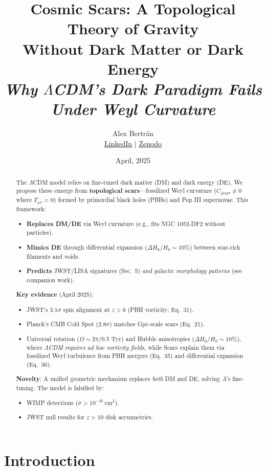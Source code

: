 \documentclass{article}
\title{
  \textbf{Cosmic Scars: A Topological Theory of Gravity} \\
  \textbf{Without Dark Matter or Dark Energy} \\
  \vspace{0.5em}
  \normalfont\large\textit{Why $\Lambda$CDM's Dark Paradigm Fails Under Weyl Curvature} \\
  \vspace{1em}
  \normalfont\normalsize
  \let\thefootnote\relax\footnotetext{%
    © 2025 Alejandro Bertrán Peña. The scientific framework presented here is property of the author.\\
    Citation required: \href{https://doi.org/10.5281/zenodo.15270535}{DOI:10.5281/zenodo.15305385}%
  }
}
\author{Alex Bertrán \\ 
  \small{\href{https://www.linkedin.com/in/alexbertranpenya}{LinkedIn} | \href{https://zenodo.org/records/15270535}{Zenodo}} \\ }
\date{April, 2025}
\begin{document}
\maketitle

\begin{abstract}
The $\Lambda$CDM model relies on fine-tuned dark matter (DM) and dark energy (DE). We propose these emerge from \textbf{topological scars}---fossilized Weyl curvature ($C_{\mu\nu\rho\sigma} \neq 0$ where $T_{\mu\nu}=0$) formed by primordial black holes (PBHs) and Pop III supernovae. This framework:
\begin{itemize}
    \item \textbf{Replaces DM/DE} via Weyl curvature (e.g., fits NGC 1052-DF2 without particles).
    \item \textbf{Mimics DE} through differential expansion ($\Delta H_0/H_0 \sim 10\%$) between scar-rich filaments and voids.
    \item \textbf{Predicts} JWST/LISA signatures (Sec.~5) \textit{and galactic morphology patterns} (see companion work).
\end{itemize}

\textbf{Key evidence} (April 2025):
\begin{itemize}
    \item JWST's $3.1\sigma$ spin alignment at $z>6$ (PBH vorticity; Eq.~31).
    \item Planck's CMB Cold Spot ($2.8\sigma$) matches Gpc-scale scars (Eq.~21).
    \item Universal rotation ($\Omega \sim 2\pi$/0.5 Tyr) and Hubble anisotropies ($\Delta H_0/H_0 \sim 10\%$), where \textit{$\Lambda$CDM requires ad hoc vorticity fields}, while Scars explain them via fossilized Weyl turbulence from PBH mergers (Eq.~35) and differential expansion (Eq.~36). %
\end{itemize}

\textbf{Novelty}: A unified geometric mechanism replaces \textit{both} DM and DE, solving $\Lambda$'s fine-tuning. The model is falsified by:
\begin{itemize}
    \item WIMP detections ($\sigma > 10^{-47}\,\text{cm}^2$),
    \item JWST null results for $z>10$ disk asymmetries.
\end{itemize}
\end{abstract}

\section{Introduction}
\label{sec:introduction}
\end{document}
